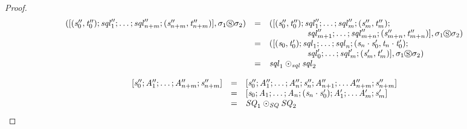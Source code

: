 \documentclass[numbers,10pt,preprint\ifanon ,nocopyrightspace\fi]{sigplanconf}
\begin{document}
\begin{proof}
  \[
    \begin{array}{rcl}
      ([(\mathit{s}_0'',\mathit{t}_0'');\mathit{sql}_1'';
      \ldots;
      \mathit{sql}_{n+m}'';(\mathit{s}_{n+m}'',\mathit{t}_{n+m}'')],
      \sigma_1\circledS\sigma_2)
      & = & ([(\mathit{s}_0'',\mathit{t}_0'');\mathit{sql}_1'';
            \ldots;\mathit{sql}_m'';(\mathit{s}_m'',\mathit{t}_m'');\\
      & & \hspace*{4.5em}\mathit{sql}_{m+1}'';
          \ldots;\mathit{sql}_{m+n}'';(\mathit{s}_{m+n}'',\mathit{t}_{m+n}'')],
          \sigma_1\circledS\sigma_2)\\
      & = & ([(\mathit{s}_0,\mathit{t}_0');\mathit{sql}_1;
            \ldots;\mathit{sql}_n;(\mathit{s}_n\cdot\mathit{s}_0',\mathit{t}_n\cdot\mathit{t}_0');\\
      & & \hspace*{4.5em}\mathit{sql}_0';
          \ldots;\mathit{sql}_m';(\mathit{s}_m',\mathit{t}_m')],
          \sigma_1\circledS\sigma_2)\\
      & = & \mathit{sql}_1\odot_{\mathit{sql}}\mathit{sql}_2
    \end{array}
  \]


  \[
    \begin{array}{rcl}
      [\mathit{s}_0'';\mathit{A}_1'';\ldots;\mathit{A}_{n+m}'';\mathit{s}_{n+m}'']
      & = & [\mathit{s}_0'';\mathit{A}_1'';\ldots;\mathit{A}_n'';\mathit{s}_n'';\mathit{A}_{n+1}'';
            \ldots\mathit{A}_{n+m}'';\mathit{s}_{n+m}'']\\
      & = & [\mathit{s}_0;\mathit{A}_1;\ldots;\mathit{A}_n;(\mathit{s}_n\cdot\mathit{s}_0');\mathit{A}_1';
            \ldots\mathit{A}_m';\mathit{s}_m']\\
      & = & \mathit{SQ}_1\odot_{\mathit{SQ}}\mathit{SQ}_2
    \end{array}
  \]



\end{proof}
\end{document}
